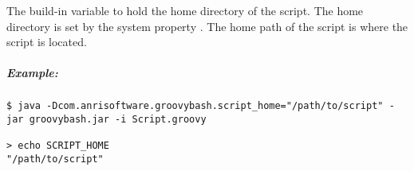 \label{par:variable_script_home}

The  build-in variable to hold the home directory
of the script. The home directory is set by the
system property .
The home path of the script is where the script is located.

\subparagraph{Example:}

\begin{lstlisting}[style=Groovybash, label={lst:example_variable_script_home}]
$ java -Dcom.anrisoftware.groovybash.script_home="/path/to/script" -jar groovybash.jar -i Script.groovy

> echo SCRIPT_HOME
"/path/to/script"
\end{lstlisting}

